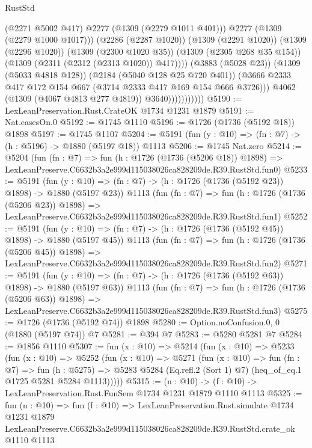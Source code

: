 \begin{lexlean}{RustStd}
\begin{coremodule}
                                    (@2271 @5002 @417)
                                    @2277
                                    (@1309 (@2279 @1011 @401)))
                                  @2277
                                  (@1309 (@2279 @1000 @1017)))
                                (@2286 (@2287 @1020))
                                (@1309 (@2291 @1020))
                                (@1309 (@2296 @1020))
                                (@1309 (@2300 @1020 @35))
                                (@1309 (@2305 @268 @35 @154))
                                (@1309 (@2311 (@2312 (@2313 @1020)) @417))))
                            (@3883 (@5028 @23))
                            (@1309 (@5033 @4818 @128))
                            (@2184 (@5040 @128 @25 @720 @401))
                            (@3666
                              @2333
                              @417
                              @172
                              @154
                              @667
                              (@3714 @2333 @417 @169 @154 @666 @3726)))
                          @4062
                          (@1309 (@4067 @4813 @277 @4819))
                          @3640)))))))))))
@5190 := LexLeanPreservation.Rust.CrateOK @1734 @1231 @1879
@5191 := Nat.casesOn.{0}
@5192 := @1745 @1110
@5196 := @1726 (@1736 (@5192 @18)) @1898
@5197 := @1745 @1107
@5204 := @5191 (fun (y : @10) => (fn : @7) -> (h : @5196) -> @1880 (@5197 @18)) @1113
@5206 := @1745 Nat.zero
@5214 := @5204
    (fun (fn : @7) =>
    fun (h : @1726 (@1736 (@5206 @18)) @1898) =>
    LexLeanPreserve.C6632b3a2e999d115038026ca828209de.R39.RustStd.fun0)
@5233 := @5191
    (fun (y : @10) => (fn : @7) -> (h : @1726 (@1736 (@5192 @23)) @1898) -> @1880 (@5197 @23))
    @1113
    (fun (fn : @7) =>
    fun (h : @1726 (@1736 (@5206 @23)) @1898) =>
    LexLeanPreserve.C6632b3a2e999d115038026ca828209de.R39.RustStd.fun1)
@5252 := @5191
    (fun (y : @10) => (fn : @7) -> (h : @1726 (@1736 (@5192 @45)) @1898) -> @1880 (@5197 @45))
    @1113
    (fun (fn : @7) =>
    fun (h : @1726 (@1736 (@5206 @45)) @1898) =>
    LexLeanPreserve.C6632b3a2e999d115038026ca828209de.R39.RustStd.fun2)
@5271 := @5191
    (fun (y : @10) => (fn : @7) -> (h : @1726 (@1736 (@5192 @63)) @1898) -> @1880 (@5197 @63))
    @1113
    (fun (fn : @7) =>
    fun (h : @1726 (@1736 (@5206 @63)) @1898) =>
    LexLeanPreserve.C6632b3a2e999d115038026ca828209de.R39.RustStd.fun3)
@5275 := @1726 (@1736 (@5192 @74)) @1898
@5280 := Option.noConfusion.{0, 0} (@1880 (@5197 @74)) @7
@5281 := @394 @7
@5283 := @5280 @5281 @7
@5284 := @1856 @1110
@5307 := fun (x : @10) =>
  @5214
    (fun (x : @10) =>
    @5233
      (fun (x : @10) =>
      @5252
        (fun (x : @10) =>
        @5271
          (fun (x : @10) =>
          fun (fn : @7) =>
          fun (h : @5275) =>
          @5283 @5284 (Eq.refl.{2} (Sort 1) @7) (heq_of_eq.{1} @1725 @5281 @5284 @1113)))))
@5315 := (n : @10) -> (f : @10) -> LexLeanPreservation.Rust.FunSem @1734 @1231 @1879 @1110 @1113
@5325 := fun (n : @10) =>
  fun (f : @10) =>
  LexLeanPreservation.Rust.simulate
    @1734
    @1231
    @1879
    LexLeanPreserve.C6632b3a2e999d115038026ca828209de.R39.RustStd.crate_ok
    @1110
    @1113
\end{coremodule}
\end{lexlean}
